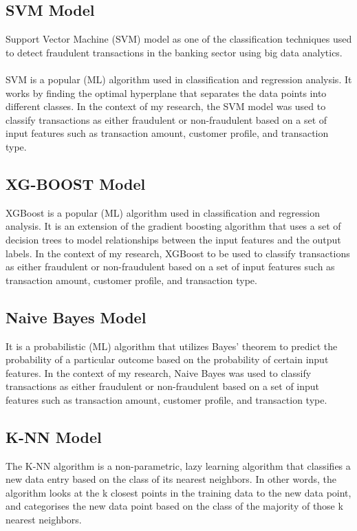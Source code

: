 \subsection{SVM Model}
Support Vector Machine (SVM) model as one of the classification techniques used to detect fraudulent transactions
 in the banking sector using big data analytics.\\\\
SVM is a popular (ML) algorithm used in classification and regression analysis. It works by finding 
the optimal hyperplane that separates the data points into different classes. In the context of my research, the 
SVM model was used to classify transactions as either fraudulent or non-fraudulent based on a set of input features 
such as transaction amount, customer profile, and transaction type.

\subsection{XG-BOOST Model}
XGBoost is a popular (ML) algorithm used in classification and regression analysis. It is an 
extension of the gradient boosting algorithm that uses a set of decision trees to model relationships 
between the input features and the output labels. In the context of my research, XGBoost to be used to classify 
transactions as either fraudulent or non-fraudulent based on a set of input features such as transaction amount, 
customer profile, and transaction type.

\subsection{Naive Bayes Model}
It is a probabilistic (ML) algorithm that utilizes Bayes' theorem to predict the probability of a 
particular outcome based on the probability of certain input features. In the context of my research, Naive Bayes 
was used to classify transactions as either fraudulent or non-fraudulent based on a set of input features such as 
transaction amount, customer profile, and transaction type.


\subsection{K-NN Model}
The K-NN algorithm is a non-parametric, lazy learning algorithm that classifies a new data entry based on the class 
of its nearest neighbors. In other words, the algorithm looks at the k closest points in the training data to the 
new data point, and categorises the new data point based on the class of the majority of those k nearest neighbors.


